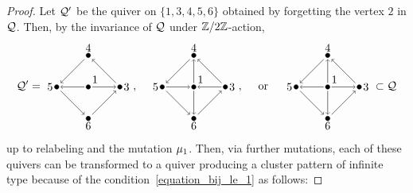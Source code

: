 \begin{proof}
Let $\mathcal{Q}'$ be the quiver on $\{1,3,4,5,6\}$ obtained by forgetting the vertex $2$ in $\mathcal{Q}$.
Then, by the invariance of $\mathcal{Q}$ under $\mathbb{Z}/2\mathbb{Z}$-action, 
\begin{align*}\label{equation:squares}
\quiver' = \begin{tikzpicture}[baseline=-.5ex]
\begin{scope}
\draw[fill] (0,0) node (A1) {} circle (2pt)
(0,1) node (A4) {} circle (2pt)
(-1,0) node (A5) {} circle (2pt) 
(0,-1) node (A6) {} circle (2pt) 
(1,0) node (A7) {} circle (2pt);
\draw[->] (A1) node[above right] {$1$} -- (A5);
\draw[->] (A1) -- (A7);
\draw[->] (A4) -- (A5) node[left] {$5$};
\draw[->] (A5) -- (A6) node[below] {$6$};
\draw[->] (A6) -- (A7) node[right] {$3$};
\draw[->] (A7) -- (A4) node[above] {$4$};
\end{scope}
\end{tikzpicture}, \quad
\begin{tikzpicture}[baseline=-.5ex]
\begin{scope}[xshift=3cm]
\draw[fill] (0,0) node (A1) {} circle (2pt)
(0,1) node (A4) {} circle (2pt)
(-1,0) node (A5) {} circle (2pt) 
(0,-1) node (A6) {} circle (2pt) 
(1,0) node (A7) {} circle (2pt);
\draw[->] (A1) node[above right] {$1$} -- (A4);
\draw[->] (A1) -- (A6);
\draw[->] (A5) -- (A1);
\draw[->] (A7) -- (A1);
\draw[->] (A4) -- (A5) node[left] {$5$};
\draw[->] (A5) -- (A6) node[below] {$6$};
\draw[->] (A6) -- (A7) node[right] {$3$};
\draw[->] (A7) -- (A4) node[above] {$4$};
\end{scope}
\end{tikzpicture},\quad\text{ or }\quad
\begin{tikzpicture}[baseline=-.5ex]
\begin{scope}[xshift=6cm]
\draw[fill] (0,0) node (A1) {} circle (2pt)
(0,1) node (A4) {} circle (2pt)
(-1,0) node (A5) {} circle (2pt) 
(0,-1) node (A6) {} circle (2pt) 
(1,0) node (A7) {} circle (2pt);
\draw[->] (A1) node[above right] {$1$} -- (A4);
\draw[->] (A1) -- (A5);
\draw[->] (A1) -- (A6);
\draw[->] (A1) -- (A7);
\draw[->] (A4) -- (A5) node[left] {$5$};
\draw[->] (A5) -- (A6) node[below] {$6$};
\draw[->] (A6) -- (A7) node[right] {$3$};
\draw[->] (A7) -- (A4) node[above] {$4$};
\end{scope}
\end{tikzpicture}
\subset \quiver
\end{align*}
up to relabeling and the mutation $\mu_1$.
Then, via further mutations, each of these quivers can be transformed to a quiver producing a cluster pattern of infinite type because of the condition~\eqref{equation_bij_le_1} as follows:

\end{proof}
